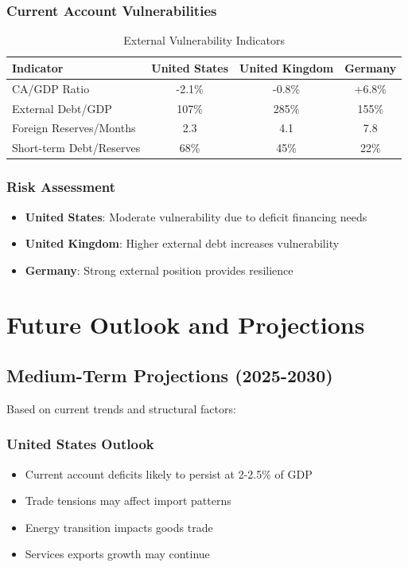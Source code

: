 \documentclass[11pt,a4paper]{article}
\begin{document}
\subsubsection{Current Account Vulnerabilities}
\begin{table}[h]
\centering
\caption{External Vulnerability Indicators}
\begin{tabular}{lccc}
\toprule
\textbf{Indicator} & \textbf{United States} & \textbf{United Kingdom} & \textbf{Germany} \\
\midrule
CA/GDP Ratio & -2.1\% & -0.8\% & +6.8\% \\
External Debt/GDP & 107\% & 285\% & 155\% \\
Foreign Reserves/Months & 2.3 & 4.1 & 7.8 \\
Short-term Debt/Reserves & 68\% & 45\% & 22\% \\
\bottomrule
\end{tabular}
\end{table}

\subsubsection{Risk Assessment}
\begin{itemize}
    \item \textbf{United States}: Moderate vulnerability due to deficit financing needs
    \item \textbf{United Kingdom}: Higher external debt increases vulnerability
    \item \textbf{Germany}: Strong external position provides resilience
\end{itemize}

\section{Future Outlook and Projections}

\subsection{Medium-Term Projections (2025-2030)}
Based on current trends and structural factors:

\subsubsection{United States Outlook}
\begin{itemize}
    \item Current account deficits likely to persist at 2-2.5\% of GDP
    \item Trade tensions may affect import patterns
    \item Energy transition impacts goods trade
    \item Services exports growth may continue
\end{itemize}
\end{document}
